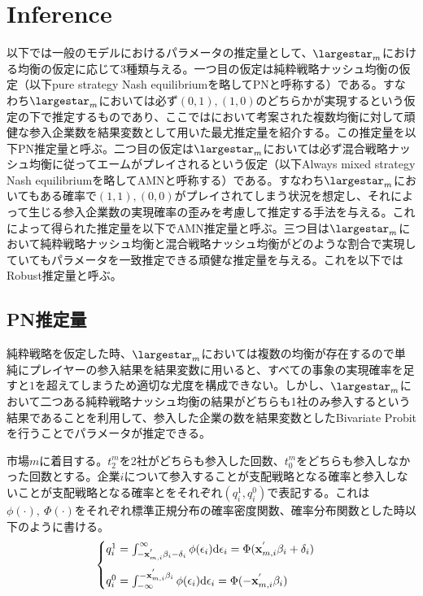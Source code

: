 \documentclass{jsarticle}
\begin{document}
\section{Inference}
以下では一般のモデルにおけるパラメータの推定量として、$\largestar_m$における均衡の仮定に応じて3種類与える。一つ目の仮定は純粋戦略ナッシュ均衡の仮定（以下pure strategy Nash equilibriumを略してPNと呼称する）である。すなわち$\largestar_m$においては必ず$(0,1), (1,0)$のどちらかが実現するという仮定の下で推定するものであり、ここでは\cite{2}において考案された複数均衡に対して頑健な参入企業数を結果変数として用いた最尤推定量を紹介する。この推定量を以下PN推定量と呼ぶ。二つ目の仮定は$\largestar_m$においては必ず混合戦略ナッシュ均衡に従ってエームがプレイされるという仮定（以下Always mixed strategy Nash equilibriumを略してAMNと呼称する）である。すなわち$\largestar_m$においてもある確率で$(1,1), (0,0)$がプレイされてしまう状況を想定し、それによって生じる参入企業数の実現確率の歪みを考慮して推定する手法を与える。これによって得られた推定量を以下でAMN推定量と呼ぶ。三つ目は$\largestar_m$において純粋戦略ナッシュ均衡と混合戦略ナッシュ均衡がどのような割合で実現していてもパラメータを一致推定できる頑健な推定量を与える。これを以下ではRobust推定量と呼ぶ。

\subsection{PN推定量}
純粋戦略を仮定した時、$\largestar_m$においては複数の均衡が存在するので単純にプレイヤーの参入結果を結果変数に用いると、すべての事象の実現確率を足すと$1$を超えてしまうため適切な尤度を構成できない。しかし、$\largestar_m$において二つある純粋戦略ナッシュ均衡の結果がどちらも1社のみ参入するという結果であることを利用して、参入した企業の数を結果変数としたBivariate Probitを行うことでパラメータが推定できる。

市場$m$に着目する。$t_2^m$を2社がどちらも参入した回数、$t_0^m$をどちらも参入しなかった回数とする。企業$i$について参入することが支配戦略となる確率と参入しないことが支配戦略となる確率とをそれぞれ$(q_i^1, q_i^0)$で表記する。これは$\phi(\cdot),\ \Phi(\cdot)$をそれぞれ標準正規分布の確率密度関数、確率分布関数とした時以下のように書ける。
\begin{align*}
\begin{cases}
	q_i^1 = \int_{-{\bf x}_{m, i}^{'} \beta_i - \delta_i}^{\infty} \phi(\epsilon_i) \mathrm{d}\epsilon_i = \Phi({\bf x}_{m, i}^{'} \beta_i + \delta_i)\\[10pt]
	q_i^0 = \int_{-\infty}^{-{\bf x}_{m, i}^{'} \beta_i} \phi(\epsilon_i) \mathrm{d}\epsilon_i = \Phi(-{\bf x}_{m, i}^{'} \beta_i)
\end{cases}
\end{align*}
\end{document}
